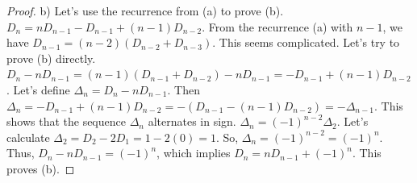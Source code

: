 \begin{enumerate}
\begin{proof}
    b) Let's use the recurrence from (a) to prove (b).
    $D_n = n D_{n-1} - D_{n-1} + (n-1)D_{n-2}$.
    From the recurrence (a) with $n-1$, we have $D_{n-1} = (n-2)(D_{n-2} + D_{n-3})$.
    This seems complicated. Let's try to prove (b) directly.
    $D_n - nD_{n-1} = (n-1)(D_{n-1}+D_{n-2}) - nD_{n-1} = -D_{n-1} + (n-1)D_{n-2}$.
    Let's define $\Delta_n = D_n - nD_{n-1}$. Then $\Delta_n = -D_{n-1} + (n-1)D_{n-2} = - (D_{n-1} - (n-1)D_{n-2}) = -\Delta_{n-1}$.
    This shows that the sequence $\Delta_n$ alternates in sign.
    $\Delta_n = (-1)^{n-2} \Delta_2$.
    Let's calculate $\Delta_2 = D_2 - 2D_1 = 1 - 2(0) = 1$.
    So, $\Delta_n = (-1)^{n-2} = (-1)^n$.
    Thus, $D_n - nD_{n-1} = (-1)^n$, which implies $D_n = nD_{n-1} + (-1)^n$. This proves (b).
    \end{proof}
\end{enumerate}

